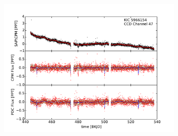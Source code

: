 \documentclass[12pt, preprint]{aastex}
\begin{document}
\begin{figure}[htb]
\begin{subfigure}[htb]{0.33\textwidth}
\includegraphics[width=\textwidth]{kic_5966154_pdc}
\end{subfigure}


\end{figure}
\end{document}
